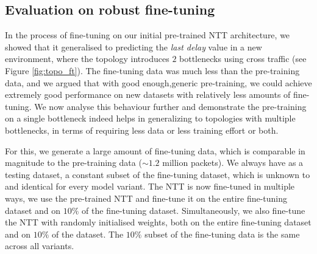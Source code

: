 \subsection{Evaluation on robust fine-tuning}
\label{ssec:robeval}

In the process of fine-tuning on our initial pre-trained NTT architecture, we showed that it generalised to predicting the \emph{last delay} value in a new environment, where the topology introduces $2$ bottlenecks using cross traffic (see Figure \ref{fig:topo_ft}). The fine-tuning data was much less than the pre-training data, and we argued that with good enough,generic pre-training, we could achieve extremely good performance on new datasets with relatively less amounts of fine-tuning. We now analyse this behaviour further and demonstrate the pre-training on a single bottleneck indeed helps in generalizing to topologies with multiple bottlenecks, in terms of requiring less data or less training effort or both. 

For this, we generate a large amount of fine-tuning data, which is comparable in magnitude to the pre-training data (${\sim}1.2$ million packets). We always have as a testing dataset, a constant subset of the fine-tuning dataset, which is unknown to and identical for every model variant. The NTT is now fine-tuned in multiple ways, we use the pre-trained NTT and fine-tune it on the entire fine-tuning dataset and on $10\%$ of the fine-tuning dataset. Simultaneously, we also fine-tune the NTT with randomly initialised weights, both on the entire fine-tuning dataset and on $10\%$ of the dataset. The $10\%$ subset of the fine-tuning data is the same across all variants. 


